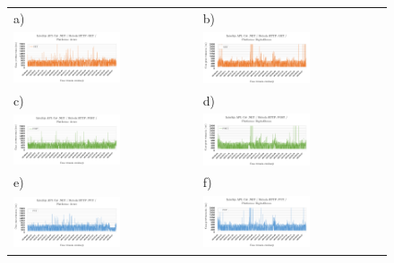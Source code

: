 \begin{figure}[H]
  \advance\leftskip-1.7cm
	\begin{tabular}{@{}ll@{}}
    a) & b) \\
    \includegraphics[width=0.6\textwidth]{rys05/dotnet-get-azure.pdf} & \includegraphics[width=0.6\textwidth]{rys05/dotnet-get-digitalocean.pdf} \\
    c) & d) \\
    \includegraphics[width=0.6\textwidth]{rys05/dotnet-post-azure.pdf} & \includegraphics[width=0.6\textwidth]{rys05/dotnet-post-digitalocean.pdf} \\
    e) & f) \\
    \includegraphics[width=0.6\textwidth]{rys05/dotnet-put-azure.pdf} & \includegraphics[width=0.6\textwidth]{rys05/dotnet-put-digitalocean.pdf} \\

\end{tabular}
\end{figure}
